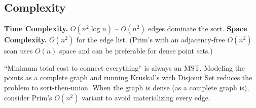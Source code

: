 \subsection*{Complexity}

\begin{complexitybox}
\textbf{Time Complexity.} $O(n^2\log n)$ -- $O(n^2)$ edges dominate the
sort. \textbf{Space Complexity.} $O(n^2)$ for the edge list. (Prim's
with an adjacency-free $O(n^2)$ scan uses $O(n)$ space and can be
preferable for dense point sets.)
\end{complexitybox}

\begin{takeawaybox}
``Minimum total cost to connect everything'' is always an MST. Modeling
the points as a complete graph and running Kruskal's with Disjoint Set
reduces the problem to sort-then-union. When the graph is dense (as a
complete graph is), consider Prim's $O(n^2)$ variant to avoid materializing
every edge.
\end{takeawaybox}
